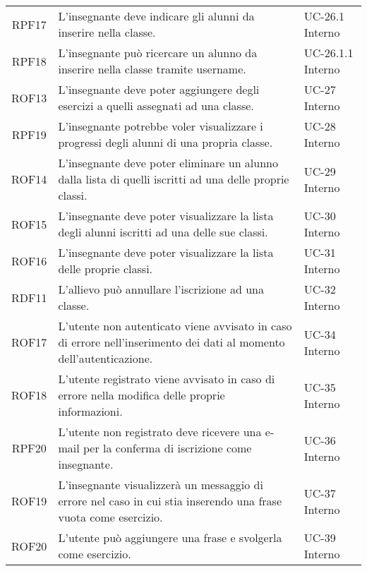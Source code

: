 \begin{tabularx}{\textwidth}{| c | p{10cm} | X |}
		RPF17 & L'insegnante deve indicare gli alunni da inserire nella classe. & UC-26.1 \newline Interno\\
		RPF18 & L'insegnante può ricercare un alunno da inserire nella classe tramite username. & UC-26.1.1 \newline Interno\\
		ROF13 & L'insegnante deve poter aggiungere degli esercizi a quelli assegnati ad una classe. & UC-27 \newline Interno\\
		RPF19 & L'insegnante potrebbe voler visualizzare i progressi degli alunni di una propria classe. & UC-28 \newline Interno\\
		ROF14 & L'insegnante deve poter eliminare un alunno dalla lista di quelli iscritti ad una delle proprie classi. & UC-29 \newline Interno\\
		ROF15 & L'insegnante deve poter visualizzare la lista degli alunni iscritti ad una delle sue classi. & UC-30 \newline Interno\\
		ROF16 & L'insegnante deve poter visualizzare la lista delle proprie classi. & UC-31 \newline Interno\\
		RDF11 & L'allievo può annullare l'iscrizione ad una classe. & UC-32 \newline Interno\\
		ROF17 & L'utente non autenticato viene avvisato in caso di errore nell'inserimento dei dati al momento dell'autenticazione. & UC-34 \newline Interno\\
		ROF18 & L'utente registrato viene avvisato in caso di errore nella modifica delle proprie informazioni. & UC-35 \newline Interno\\
		RPF20 & L'utente non registrato deve ricevere una e-mail per la conferma di iscrizione come insegnante. & UC-36 \newline Interno\\
		ROF19 & L'insegnante visualizzerà un messaggio di errore nel caso in cui stia inserendo una frase vuota come esercizio. & UC-37 \newline Interno\\
		ROF20 & L'utente può aggiungere una frase e svolgerla come esercizio. & UC-39 \newline Interno\\

\end{tabularx}
